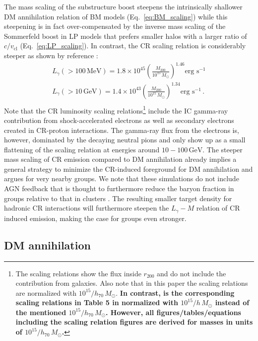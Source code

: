 \documentclass[10pt,aps,pra,reprint,amsmath,amsfonts,amssymb,showpacs,nofootinbib,floatfix]{revtex4-1}
\def\C#1{{\bf #1}}
\newcommand{\rmn}{\mathrm}
\newcommand{\msun}{M_\odot}
\newcommand{\mev}{\rmn{MeV}}
\newcommand{\gev}{\rmn{GeV}}
\newcommand{\sigv}{v_\rmn{cl}}
\newcommand{\rvir}{r_{200}}
\newcommand{\mvir}{M_{200}}
\begin{document}
The mass scaling of the substructure boost steepens the intrinsically
shallower DM annihilation relation of BM models
(Eq.~\ref{eq:BM_scaling}) while this steepening is in fact
over-compensated by the inverse mass scaling of the Sommerfeld boost
in LP models that prefers smaller halos with a larger ratio of
$c/\sigv$ (Eq.~\ref{eq:LP_scaling}). In contrast, the CR scaling
relation is considerably steeper as shown by reference
\cite{2010MNRAS.409..449P}:
\begin{eqnarray}
L_{\gamma}(>100\,\mev) = 1.8\times10^{45}
\left(\frac{\mvir}{10^{15}\,\msun}\right)^{1.46}\mbox{erg~s}^{-1}\nonumber\\
L_{\gamma}(>10\,\gev)  = 1.4\times10^{43}
\left(\frac{\mvir}{10^{15}\,\msun}\right)^{1.34}\mbox{erg~s}^{-1}\,.\nonumber\\
\end{eqnarray}
Note that the CR luminosity scaling relations\footnote{The scaling
  relations show the flux inside $\rvir$ and do not include the
  contribution from galaxies. Also note that in this paper the scaling
  relations are normalized with $10^{15}/h_{70}\,\msun$. \C{In
    contrast, is the corresponding scaling relations in Table 5 in
    \cite{2010MNRAS.409..449P} normalized with $10^{15}/h\,\msun$
    instead of the mentioned $10^{15}/h_{70}\,\msun$. However, all
    figures/tables/equations including the scaling relation figures
    are derived for masses in units of $10^{15}/h_{70}\,\msun$.}}
include the IC gamma-ray contribution from shock-accelerated electrons
as well as secondary electrons created in CR-proton interactions. The
gamma-ray flux from the electrons is, however, dominated by the
decaying neutral pions and only show up as a small flattening of the
scaling relation at energies around $10-100\,\gev$. The steeper mass
scaling of CR emission compared to DM annihilation already implies a
general strategy to minimize the CR-induced foreground for DM
annihilation and argues for very nearby groups. We note that these
simulations do not include AGN feedback that is thought to furthermore
reduce the baryon fraction in groups relative to that in clusters
\cite{2008ApJ...687L..53P}. The resulting smaller target density for
hadronic CR interactions will furthermore steepen the $L_\gamma-M$
relation of CR induced emission, making the case for groups even
stronger.

\subsection{DM annihilation}
\end{document}
